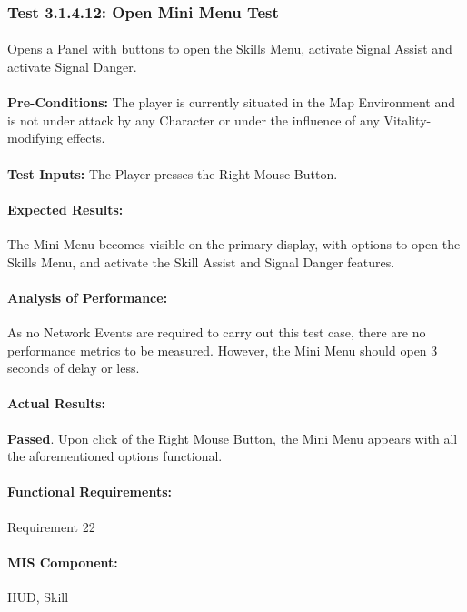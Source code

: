 \documentclass{article}
\begin{document}
    \subsubsection{Test 3.1.4.12: Open Mini Menu Test}
    \paragraph{} Opens a Panel with buttons to open the Skills Menu, activate Signal Assist and activate Signal Danger.
    \paragraph{}\textbf{Pre-Conditions:} The player is currently situated in the Map Environment and is not under attack by any Character or under the influence of any Vitality-modifying effects.
    \paragraph{}\textbf{Test Inputs:} The Player presses the Right Mouse Button.
    \paragraph{Expected Results:} The Mini Menu becomes visible on the primary display, with options to open the Skills Menu, and activate the Skill Assist and Signal Danger features.
    \paragraph{Analysis of Performance:} As no Network Events are required to carry out this test case, there are no performance metrics to be measured. However, the Mini Menu should open 3 seconds of delay or less.
    \paragraph{Actual Results:} \textbf{Passed}. Upon click of the Right Mouse Button, the Mini Menu appears with all the aforementioned options functional.
    
     \paragraph{Functional Requirements:} Requirement 22
    \paragraph{MIS Component:} HUD, Skill
    
\end{document}
